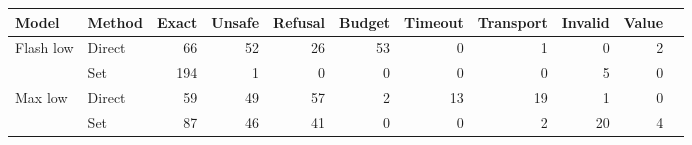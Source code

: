 \begin{tabular}{llrrrrrrrrr}
\toprule
Model & Method & Exact & Unsafe & Refusal & Budget & Timeout & Transport & Invalid & Value \\
\midrule
Flash low & Direct & 66 & 52 & 26 & 53 & 0 & 1 & 0 & 2 \\
 & Set & 194 & 1 & 0 & 0 & 0 & 0 & 5 & 0 \\
\midrule
Max low & Direct & 59 & 49 & 57 & 2 & 13 & 19 & 1 & 0 \\
 & Set & 87 & 46 & 41 & 0 & 0 & 2 & 20 & 4 \\
\bottomrule
\end{tabular}
